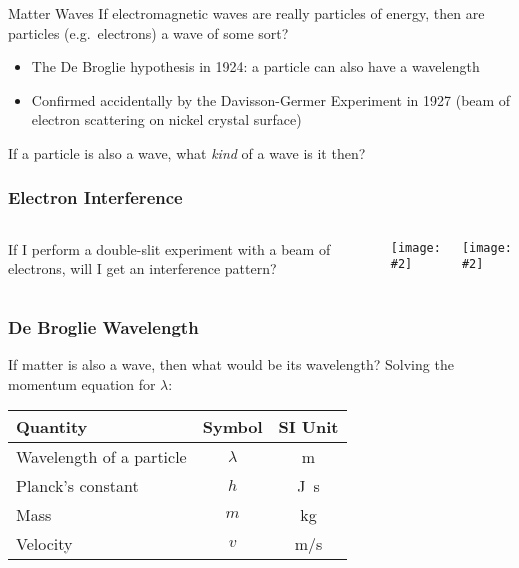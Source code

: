 \documentclass[12pt,compress,aspectratio=169]{beamer}
\newcommand{\pic}[2]{\texttt{[image: \#2]}}
\newcommand{\eq}[2]{\vspace{#1}{\Large\begin{displaymath}#2\end{displaymath}}}
\begin{document}
\begin{frame}{Matter Waves}
  If electromagnetic waves are really particles of energy, then are particles
  (e.g.\ electrons) a wave of some sort?
  \begin{itemize}
  \item The De Broglie hypothesis in 1924: a particle can also have a
    wavelength
  \item Confirmed accidentally by the Davisson-Germer Experiment in 1927 (beam
    of electron scattering on nickel crystal surface)
  \end{itemize}

  \vspace{.1in}If a particle is also a wave, what \emph{kind} of a wave is it
  then?
\end{frame}



\begin{frame}
  \frametitle{Electron Interference}
  \begin{columns}
    If I perform a double-slit experiment with a beam of electrons, will I get
    an interference pattern?
    \begin{center}
      \pic{.7}{CNX_Chem_06_03_Electrnin.png}
    \end{center}

    \pic{1}{206px-Double-slit_experiment_results_Tanamura_2.jpg}
  \end{columns}
\end{frame}



\begin{frame}
  \frametitle{De Broglie Wavelength}
  If matter is also a wave, then what would be its wavelength? Solving the
  momentum equation for $\lambda$:

  \eq{-.2in}{
    p=\frac{h}{\lambda}\;\;\rightarrow\;\;
    \lambda=\frac{h}{p}\;\;\rightarrow\;\;\boxed{\lambda=\frac{h}{mv}}
  }

  \vspace{-.1in}
  \begin{center}
    \begin{tabular}{l|c|c}
      \rowcolor{pink}
      \textbf{Quantity} & \textbf{Symbol} & \textbf{SI Unit} \\ \hline
      Wavelength of a particle & $\lambda$ & \si{\metre} \\
      Planck's constant & $h$  & \si{\joule.\second} \\
      Mass              & $m$  & \si{\kilo\gram} \\
      Velocity          & $v$  & \si{\metre/\second}
    \end{tabular}
  \end{center}
\end{frame}
\end{document}

